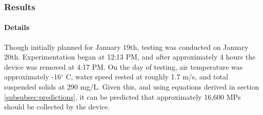 \documentclass[fleqn,10pt]{SelfArx} %
\begin{document}
	\subsubsection{Results}
	\paragraph*{Details}
	Though initially planned for January 19th, testing was conducted on January 20th. Experimentation began at 12:13 PM, and after approximately 4 hours the device was removed at 4:17 PM. On the day of testing, air temperature was approximately -16$^{\circ}$ C, water speed rested at roughly 1.7 m/s, and total suspended solids at 290 mg/L. Given this, and using equations derived in section \ref{subsubsec:predictions}, it can be predicted that approximately 16,600 MPs should be collected by the device. 
	
	
	
\end{document}
